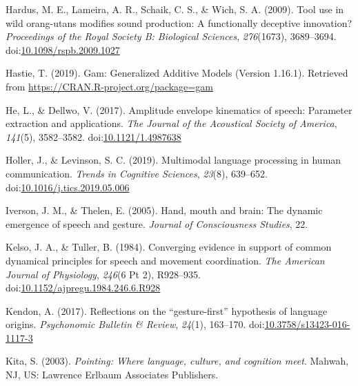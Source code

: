 \documentclass[
  man, noextraspace,floatsintext]{apa6}
\newlength{\cslhangindent}
\newenvironment{cslreferences}%
  {\setlength{\parindent}{0pt}%
  \everypar{\setlength{\hangindent}{\cslhangindent}}\ignorespaces}%
  {\par}
\begin{document}
\begin{cslreferences}
\leavevmode\hypertarget{ref-hardusToolUseWild2009}{}%
Hardus, M. E., Lameira, A. R., Schaik, C. S., \& Wich, S. A. (2009). Tool use in wild orang-utans modifies sound production: A functionally deceptive innovation? \emph{Proceedings of the Royal Society B: Biological Sciences}, \emph{276}(1673), 3689--3694. doi:\href{https://doi.org/10.1098/rspb.2009.1027}{10.1098/rspb.2009.1027}

\leavevmode\hypertarget{ref-hastieGamGeneralizedAdditive2019}{}%
Hastie, T. (2019). Gam: Generalized Additive Models (Version 1.16.1). Retrieved from \url{https://CRAN.R-project.org/package=gam}

\leavevmode\hypertarget{ref-heAmplitudeEnvelopeKinematics2017a}{}%
He, L., \& Dellwo, V. (2017). Amplitude envelope kinematics of speech: Parameter extraction and applications. \emph{The Journal of the Acoustical Society of America}, \emph{141}(5), 3582--3582. doi:\href{https://doi.org/10.1121/1.4987638}{10.1121/1.4987638}

\leavevmode\hypertarget{ref-hollerMultimodalLanguageProcessing2019}{}%
Holler, J., \& Levinson, S. C. (2019). Multimodal language processing in human communication. \emph{Trends in Cognitive Sciences}, \emph{23}(8), 639--652. doi:\href{https://doi.org/10.1016/j.tics.2019.05.006}{10.1016/j.tics.2019.05.006}

\leavevmode\hypertarget{ref-iversonHandMouthBrain2005}{}%
Iverson, J. M., \& Thelen, E. (2005). Hand, mouth and brain: The dynamic emergence of speech and gesture. \emph{Journal of Consciousness Studies}, 22.

\leavevmode\hypertarget{ref-kelsoConvergingEvidenceSupport1984}{}%
Kelso, J. A., \& Tuller, B. (1984). Converging evidence in support of common dynamical principles for speech and movement coordination. \emph{The American Journal of Physiology}, \emph{246}(6 Pt 2), R928--935. doi:\href{https://doi.org/10.1152/ajpregu.1984.246.6.R928}{10.1152/ajpregu.1984.246.6.R928}

\leavevmode\hypertarget{ref-kendonReflectionsGesturefirstHypothesis2017}{}%
Kendon, A. (2017). Reflections on the ``gesture-first'' hypothesis of language origins. \emph{Psychonomic Bulletin \& Review}, \emph{24}(1), 163--170. doi:\href{https://doi.org/10.3758/s13423-016-1117-3}{10.3758/s13423-016-1117-3}

\leavevmode\hypertarget{ref-kitaPointingWhereLanguage2003}{}%
Kita, S. (2003). \emph{Pointing: Where language, culture, and cognition meet}. Mahwah, NJ, US: Lawrence Erlbaum Associates Publishers.


\end{cslreferences}
\end{document}
